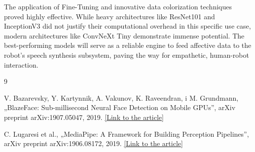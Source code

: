 \documentclass{article}
\begin{document}
The application of Fine-Tuning and innovative data colorization techniques proved highly effective. While heavy architectures like ResNet101 and InceptionV3 did not justify their computational overhead in this specific use case, modern architectures like ConvNeXt Tiny demonstrate immense potential. The best-performing models will serve as a reliable engine to feed affective data to the robot's speech synthesis subsystem, paving the way for empathetic, human-robot interaction.
\begin{thebibliography}{9}

    V. Bazarevsky, Y. Kartynnik, A. Vakunov, K. Raveendran, i M. Grundmann, „BlazeFace: Sub-millisecond Neural Face Detection on Mobile GPUs”, arXiv preprint arXiv:1907.05047, 2019. \href{https://arxiv.org/abs/1907.05047}{[Link to the article]} 
    
    C. Lugaresi et al., „MediaPipe: A Framework for Building Perception Pipelines”, arXiv preprint arXiv:1906.08172, 2019. \href{https://arxiv.org/abs/1906.08172}{[Link to the article]} 
    

\end{thebibliography}
\end{document}
